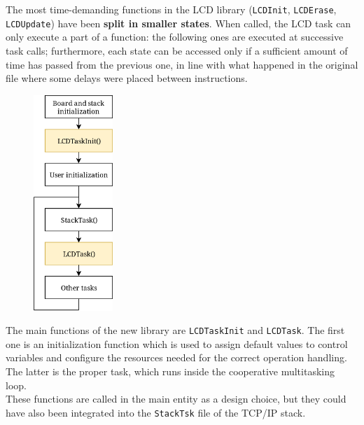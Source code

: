 The most time-demanding functions in the LCD library (\texttt{LCDInit}, \texttt{LCDErase}, \texttt{LCDUpdate}) have been \textbf{split in smaller states}. When called, the LCD task can only execute a part of a function: the following ones are executed at successive task calls; furthermore, each state can be accessed only if a sufficient amount of time has passed from the previous one, in line with what happened in the original file where some delays were placed between instructions.\\

\begin{figure}
	\includegraphics[width=3cm]{images/taskmgmt}
	\label{fig:taskmgmt}
\end{figure}

The main functions of the new library are \texttt{LCDTaskInit} and \texttt{LCDTask}. The first one is an initialization function which is used to assign default values to control variables and configure the resources needed for the correct operation handling. The latter is the proper task, which runs inside the cooperative multitasking loop.\\
These functions are called in the main entity as a design choice, but they could have also been integrated into the \texttt{StackTsk} file of the TCP/IP stack.\\

